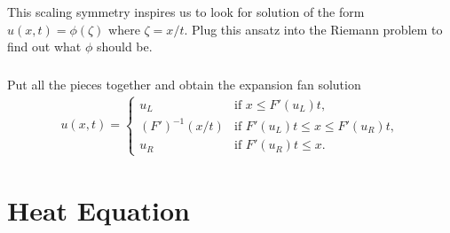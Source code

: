 \documentclass[11pt,letterpaper]{report}
\begin{document}
\subsection{}
This scaling symmetry inspires us to look for solution of the form $u(x,t) = \phi(\zeta)$ where $\zeta = x/t$. Plug this ansatz into the Riemann problem to find out what $\phi$ should be.

\subsection{}
Put all the pieces together and obtain the expansion fan solution
\begin{align}
    u(x,t) = \begin{cases}
        u_L &\text{if } x \leq F'(u_L) t, \\
        (F')^{-1}(x/t) &\text{if } F'(u_L) t \leq x \leq F'(u_R) t, \\
        u_R &\text{if } F'(u_R) t \leq x.
    \end{cases}
\end{align}

\chapter{Heat Equation}


\newpage
\printbibliography
\end{document}
